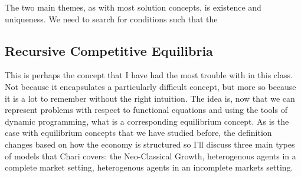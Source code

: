 \documentclass[11pt,english]{article}
\begin{document}
The two main themes, as with most solution concepts, is existence and uniqueness. We need to search for conditions such that the 


\subsection{Recursive Competitive Equilibria}
This is perhaps the concept that I have had the most trouble with in this class. Not because it encapsulates a particularly difficult concept, but more so because it is a lot to remember without the right intuition. The idea is, now that we can represent problems with respect to functional equations and using the tools of dynamic programming, what is a corresponding equilibrium concept. As is the case with equilibrium concepts that we have studied before, the definition changes based on how the economy is structured so I'll discuss three main types of models that Chari covers: the Neo-Classical Growth, heterogenous agents in a complete market setting, heterogenous agents in an incomplete markets setting. 
\end{document}

